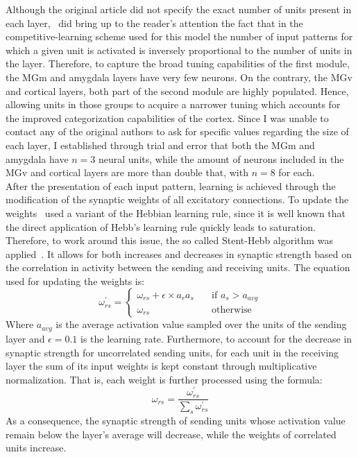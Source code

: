Although the original article did not specify the exact number of units present in each layer,~\citet{Armony1995} did bring up to the reader's attention the fact that in the competitive-learning scheme used for this model the number of input patterns for which a given unit is activated is inversely proportional to the number of units in the layer. Therefore, to capture the broad tuning capabilities of the first module, the MGm and amygdala layers have very few neurons. On the contrary, the MGv and cortical layers, both part of the second module are highly populated. Hence, allowing units in those groups to acquire a narrower tuning which accounts for the improved categorization capabilities of the cortex. Since I was unable to contact any of the original authors to ask for specific values regarding the size of each layer, I established through trial and error that both the MGm and amygdala have $n = 3$ neural units, while the amount of neurons included in the MGv and cortical layers are more than double that, with $n=8$ for each.\\

After the presentation of each input pattern, learning is achieved through the modification of the synaptic weights of all excitatory connections. To update the weights~\citet{Armony1995} used a variant of the Hebbian learning rule, since it is well known that the direct application of Hebb's learning rule quickly leads to saturation. Therefore, to work around this issue, the so called Stent-Hebb algorithm was applied~\supercite{stent_physiological_1973}. It allows for both increases and decreases in synaptic strength based on the correlation in activity between the sending and receiving units. The equation used for updating the weights is:
\begin{equation}\label{equ:hebb1}
   \omega^{\prime}_{rs} = 
   \begin{cases}
      \omega_{rs} + \epsilon \times a_{r} a_{s} & \quad \text{if } a_{s} > a_{avg}\\
      \omega_{rs} & \quad \text{otherwise}
   \end{cases}
\end{equation}
Where $a_{avg}$ is the average activation value sampled over the units of the sending layer and $\epsilon = 0.1$ is the learning rate. Furthermore, to account for the decrease in synaptic strength for uncorrelated sending units, for each unit in the receiving layer the sum of its input weights is kept constant through multiplicative normalization. That is, each weight is further processed using the formula:
\begin{equation}\label{equ:normal}
   \omega_{rs} = \frac{\omega^{\prime}_{rs}}{\sum_{s} \omega^{\prime}_{rs}}
\end{equation}
As a consequence, the synaptic strength of sending units whose activation value remain below the layer's average will decrease, while the weights of correlated units increase.\\

